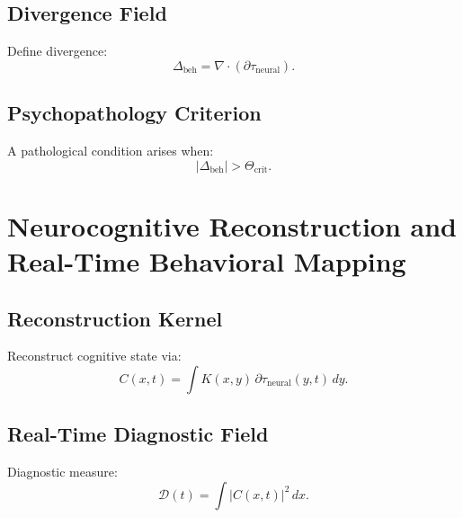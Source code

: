 \section{Divergence Field}
Define divergence:
\[
\Delta_{\mathrm{beh}} = \nabla \cdot (\partial\tau_{\mathrm{neural}}).
\]

\section{Psychopathology Criterion}
A pathological condition arises when:
\[
|\Delta_{\mathrm{beh}}| > \Theta_{\mathrm{crit}}.
\]

\chapter{Neurocognitive Reconstruction and Real-Time Behavioral Mapping}

\section{Reconstruction Kernel}
Reconstruct cognitive state via:
\[
C(x,t) = \int K(x,y)\,\partial\tau_{\mathrm{neural}}(y,t)\, dy.
\]

\section{Real-Time Diagnostic Field}
Diagnostic measure:
\[
\mathcal{D}(t) = \int |C(x,t)|^2\, dx.
\]
